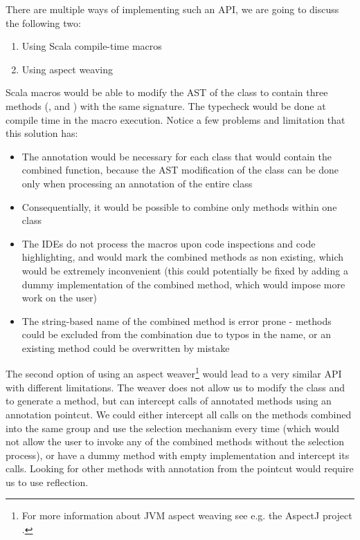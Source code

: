 There are multiple ways of implementing such an API, we are going to discuss the following two:

\begin{enumerate}
	\item Using Scala compile-time macros
	\item Using aspect weaving
\end{enumerate}

Scala macros would be able to modify the AST of the  class to contain three methods (,  and ) with the same signature. The typecheck would be done at compile time in the macro execution. Notice a few problems and limitation that this solution has:

\begin{itemize}
	\item The  annotation would be necessary for each class that would contain the combined function, because the AST modification of the class can be done only when processing an annotation of the entire class
	\item Consequentially, it would be possible to combine only methods within one class
	\item The IDEs do not process the macros upon code inspections and code highlighting, and would mark the combined methods as non existing, which would be extremely inconvenient (this could potentially be fixed by adding a dummy implementation of the combined method, which would impose more work on the user)
	\item The string-based name of the combined method is error prone - methods could be excluded from the combination due to typos in the name, or an existing method could be overwritten by mistake
\end{itemize}

The second option of using an aspect weaver\footnote{For more information about JVM aspect weaving see e.g. the AspectJ project \cite{here_aspectj_nodate}.} would lead to a very similar API with different limitations. The weaver does not allow us to modify the class and to generate a method, but can intercept calls of annotated methods using an annotation pointcut. We could either intercept all calls on the methods combined into the same group and use the selection mechanism every time (which would not allow the user to invoke any of the combined methods without the selection process), or have a dummy method with empty implementation and intercept its calls. Looking for other methods with annotation from the pointcut would require us to use reflection.

